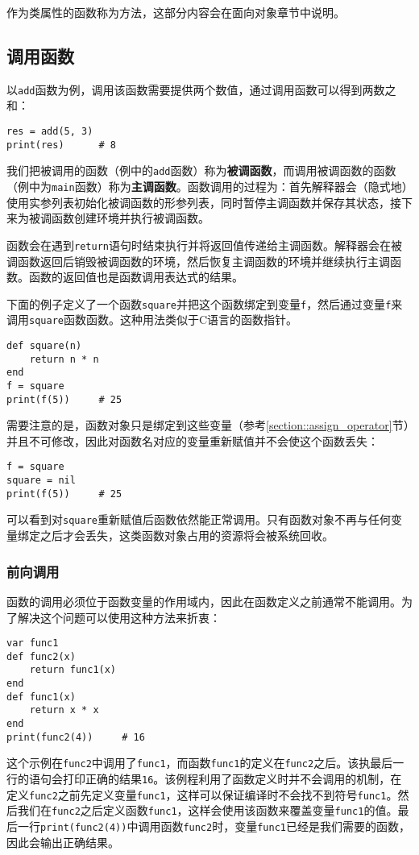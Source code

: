 作为类属性的函数称为方法，这部分内容会在面向对象章节中说明。

\subsection{调用函数}

以\texttt{add}函数为例，调用该函数需要提供两个数值，通过调用函数可以得到两数之和：
\begin{lstlisting}[language=berry, numbers=none]
res = add(5, 3)
print(res)      # 8
\end{lstlisting}
我们把被调用的函数（例中的\texttt{add}函数）称为\textbf{被调函数}，而调用被调函数的函数（例中为\texttt{main}函数）称为\textbf{主调函数}。函数调用的过程为：首先解释器会（隐式地）使用实参列表初始化被调函数的形参列表，同时暂停主调函数并保存其状态，接下来为被调函数创建环境并执行被调函数。

函数会在遇到\texttt{return}语句时结束执行并将返回值传递给主调函数。解释器会在被调函数返回后销毁被调函数的环境，然后恢复主调函数的环境并继续执行主调函数。函数的返回值也是函数调用表达式的结果。

下面的例子定义了一个函数\texttt{square}并把这个函数绑定到变量\texttt{f}，然后通过变量\texttt{f}来调用\texttt{square}函数函数。这种用法类似于C语言的函数指针。
\begin{lstlisting}[language=berry, numbers=none]
def square(n)
    return n * n
end
f = square
print(f(5))     # 25
\end{lstlisting}
需要注意的是，函数对象只是绑定到这些变量（参考\ref{section::assign_operator}节）并且不可修改，因此对函数名对应的变量重新赋值并不会使这个函数丢失：
\begin{lstlisting}[language=berry, numbers=none]
f = square
square = nil
print(f(5))     # 25
\end{lstlisting}
可以看到对\texttt{square}重新赋值后函数依然能正常调用。只有函数对象不再与任何变量绑定之后才会丢失，这类函数对象占用的资源将会被系统回收。

\subsubsection{前向调用}

函数的调用必须位于函数变量的作用域内，因此在函数定义之前通常不能调用。为了解决这个问题可以使用这种方法来折衷：
\begin{lstlisting}[language=berry, numbers=none]
var func1
def func2(x)
    return func1(x)
end
def func1(x)
    return x * x
end
print(func2(4))     # 16
\end{lstlisting}
这个示例在\texttt{func2}中调用了\texttt{func1}，而函数\texttt{func1}的定义在\texttt{func2}之后。该执最后一行的语句会打印正确的结果\texttt{16}。该例程利用了函数定义时并不会调用的机制，在定义\texttt{func2}之前先定义变量\texttt{func1}，这样可以保证编译时不会找不到符号\texttt{func1}。然后我们在\texttt{func2}之后定义函数\texttt{func1}，这样会使用该函数来覆盖变量\texttt{func1}的值。最后一行\texttt{print(func2(4))}中调用函数\texttt{func2}时，变量\texttt{func1}已经是我们需要的函数，因此会输出正确结果。

